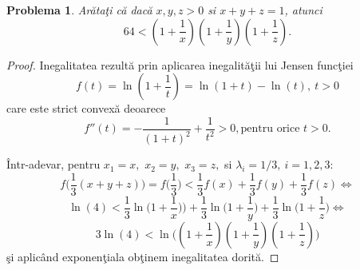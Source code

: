 \documentclass[a4paper,12pt,oneside]{report}
\newtheorem{problem}{Problema}
\begin{document}
\begin{problem}
Ar\u{a}ta\c{t}i c\u{a} dac\u{a} \(x , y , z > 0\) si \(x+ y + z = 1\), atunci
\begin{displaymath}
  64 < \left ( 1 + \frac{1}{x} \right )\left ( 1 + \frac{1}{y} \right )\left ( 1 + \frac{1}{z} \right ).
\end{displaymath}
\end{problem}
\begin{proof}
Inegalitatea rezult\u{a} prin aplicarea inegalit\u{a}\c{t}ii lui Jensen func\c{t}iei
\begin{displaymath}
  f\left ( t \right ) = \ln \left ( 1+\frac{1}{t} \right ) = \ln \left ( 1 + t \right ) - \ln \left ( t \right ),~t>0
\end{displaymath}
care este strict convex\u{a} deoarece
\begin{displaymath}
  {f}''\left ( t \right ) = -\frac{1}{\left ( 1 + t \right )^{2}} + \frac{1}{t^{2}} > 0,  \text{pentru orice } t > 0.
\end{displaymath}

\^{I}ntr-adevar, pentru  $x_1=x,$ $x_2=y,$ $x_3=z,$ si $\lambda_i=1/3,~i=1, 2, 3:$
\[
f\biggl(\frac{1}{3}(x+y+z)\biggr)=f\biggl(\frac{1}{3}\biggr)<\frac{1}{3}f(x)+\frac{1}{3}f(y)+\frac{1}{3}f(z)\Leftrightarrow
\]
\[
\ln (4)<\frac{1}{3}\ln\biggl(1+\frac{1}{x})\biggr) +\frac{1}{3}\ln\biggl(1+\frac{1}{y}\biggr)+\frac{1}{3}\ln\biggl(1+\frac{1}{z}\biggr)\Leftrightarrow
\]
\[
3\ln (4)< \ln\biggl((1+\frac{1}{x})(1+\frac{1}{y})(1+\frac{1}{z})\biggr)
\]
\c{s}i aplic\^{a}nd exponen\c{t}iala ob\c{t}inem inegalitatea dorit\u{a}.
\end{proof}
\end{document}
